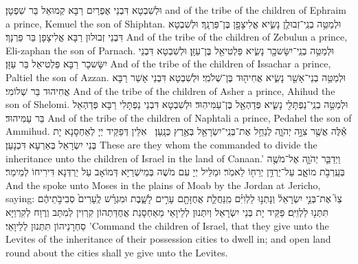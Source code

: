 {וּלְשִׁבְטָא דִּבְנֵי אֶפְרַיִם רַבָּא קְמוּאֵל בַּר שִׁפְטָן׃}
{and of the tribe of the children of Ephraim a prince, Kemuel the son of Shiphtan.}{}
{וּלְמַטֵּ֥ה בְנֵֽי־זְבוּלֻ֖ן נָשִׂ֑יא אֱלִיצָפָ֖ן בֶּן־פַּרְנָֽךְ׃}
{וּלְשִׁבְטָא דִּבְנֵי זְבוּלוּן רַבָּא אֱלִיצָפָן בַּר פַּרְנָךְ׃}
{And of the tribe of the children of Zebulun a prince, Eli-zaphan the son of Parnach.}{}
{וּלְמַטֵּ֥ה בְנֵֽי־יִשָּׂשכָ֖ר נָשִׂ֑יא פַּלְטִיאֵ֖ל בֶּן־עַזָּֽן׃}
{וּלְשִׁבְטָא דִּבְנֵי יִשָּׂשכָר רַבָּא פַּלְטִיאֵל בַּר עַזָּן׃}
{And of the tribe of the children of Issachar a prince, Paltiel the son of Azzan.}{}
{וּלְמַטֵּ֥ה בְנֵי־אָשֵׁ֖ר נָשִׂ֑יא אֲחִיה֖וּד בֶּן־שְׁלֹמִֽי׃}
{וּלְשִׁבְטָא דִּבְנֵי אָשֵׁר רַבָּא אֲחִיהוּד בַּר שְׁלוֹמִי׃}
{And of the tribe of the children of Asher a prince, Ahihud the son of Shelomi.}{}
{וּלְמַטֵּ֥ה בְנֵֽי־נַפְתָּלִ֖י נָשִׂ֑יא פְּדַהְאֵ֖ל בֶּן־עַמִּיהֽוּד׃}
{וּלְשִׁבְטָא דִּבְנֵי נַפְתָּלִי רַבָּא פְּדַהְאֵל בַּר עַמִּיהוּד׃}
{And of the tribe of the children of Naphtali a prince, Pedahel the son of Ammihud.}{}
{אֵ֕לֶּה אֲשֶׁ֖ר צִוָּ֣ה יְהֹוָ֑ה לְנַחֵ֥ל אֶת־בְּנֵֽי־יִשְׂרָאֵ֖ל בְּאֶ֥רֶץ כְּנָֽעַן׃ \petucha 
{}}
{אִלֵּין דְּפַקֵּיד יְיָ לְאַחְסָנָא יָת בְּנֵי יִשְׂרָאֵל בְּאַרְעָא דִּכְנָעַן׃}
{These are they whom the \lord\space commanded to divide the inheritance unto the children of Israel in the land of Canaan.’}{}
\newperek
{}%
{וַיְדַבֵּ֧ר יְהֹוָ֛ה אֶל־מֹשֶׁ֖ה בְּעַֽרְבֹ֣ת מוֹאָ֑ב עַל־יַרְדֵּ֥ן יְרֵח֖וֹ לֵאמֹֽר׃}
{וּמַלֵּיל יְיָ עִם מֹשֶׁה בְּמֵישְׁרַיָּא דְּמוֹאָב עַל יַרְדְּנָא דִּירִיחוֹ לְמֵימַר׃}
{And the \lord\space spoke unto Moses in the plains of Moab by the Jordan at Jericho, saying:}{}
{צַו֮ אֶת־בְּנֵ֣י יִשְׂרָאֵל֒ וְנָתְנ֣וּ לַלְוִיִּ֗ם מִֽנַּחֲלַ֛ת אֲחֻזָּתָ֖ם עָרִ֣ים לָשָׁ֑בֶת וּמִגְרָ֗שׁ לֶֽעָרִים֙ סְבִיבֹ֣תֵיהֶ֔ם תִּתְּנ֖וּ לַלְוִיִּֽם׃
}
{פַּקֵּיד יָת בְּנֵי יִשְׂרָאֵל וְיִתְּנוּן לְלֵיוָאֵי מֵאַחְסָנַת אֲחֻדַּתְהוֹן קִרְוִין לְמִתַּב וְרֶוַח לְקִרְוַיָּא סַחְרָנֵיהוֹן תִּתְּנוּן לְלֵיוָאֵי׃}
{’Command the children of Israel, that they give unto the Levites of the inheritance of their possession cities to dwell in; and open land round about the cities shall ye give unto the Levites.}{}
